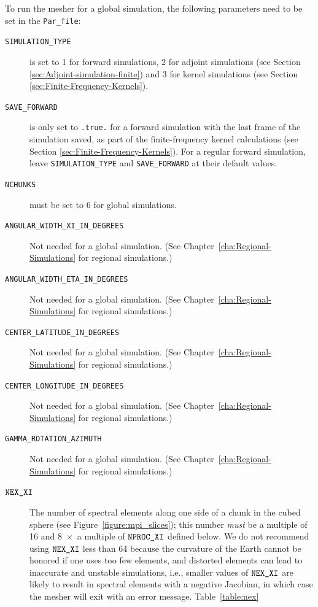 \documentclass[oneside,english]{book}
\newcommand{\nexxi}{\mbox{\texttt{NEX\_XI}}}
\newcommand{\nprocxi}{\mbox{\texttt{NPROC\_XI}}}
\begin{document}
To run the mesher for a global simulation, the following parameters
need to be set in the \texttt{Par\_file}:

\begin{description}
\item [{\texttt{SIMULATION\_TYPE}}] is set to 1 for forward simulations,
2 for adjoint simulations (see Section \ref{sec:Adjoint-simulation-finite})
and 3 for kernel simulations (see Section \ref{sec:Finite-Frequency-Kernels}).
\item [{\texttt{SAVE\_FORWARD}}] is only set to \texttt{.true.} for a forward
simulation with the last frame of the simulation saved, as part of
the finite-frequency kernel calculations (see Section \ref{sec:Finite-Frequency-Kernels}).
For a regular forward simulation, leave \texttt{SIMULATION\_TYPE}
and \texttt{SAVE\_FORWARD} at their default values.
\item [{\texttt{NCHUNKS}}] must be set to 6 for global simulations.
\item [{\texttt{ANGULAR\_WIDTH\_XI\_IN\_DEGREES}}] Not needed for a global
simulation. (See Chapter~\ref{cha:Regional-Simulations} for regional
simulations.)
\item [{\texttt{ANGULAR\_WIDTH\_ETA\_IN\_DEGREES}}] Not needed for a global
simulation. (See Chapter~\ref{cha:Regional-Simulations} for regional
simulations.)
\item [{\texttt{CENTER\_LATITUDE\_IN\_DEGREES}}] Not needed for a global
simulation. (See Chapter~\ref{cha:Regional-Simulations} for regional
simulations.)
\item [{\texttt{CENTER\_LONGITUDE\_IN\_DEGREES}}] Not needed for a global
simulation. (See Chapter~\ref{cha:Regional-Simulations} for regional
simulations.)
\item [{\texttt{GAMMA\_ROTATION\_AZIMUTH}}] Not needed for a global simulation.
(See Chapter~\ref{cha:Regional-Simulations}  for regional simulations.)
\item [{$\nexxi$}] The number of spectral elements along one side of a
chunk in the cubed sphere (see Figure~\ref{figure:mpi_slices});
this number \textit{must} be a multiple of 16 and 8~$\times$~a
multiple of $\nprocxi$ defined below. We do not recommend using $\nexxi$
less than 64 because the curvature of the Earth cannot be honored
if one uses too few elements, and distorted elements can lead to inaccurate
and unstable simulations, i.e., smaller values of $\nexxi$ are likely
to result in spectral elements with a negative Jacobian, in which
case the mesher will exit with an error message. Table~\ref{table:nex}

\end{description}
\end{document}
